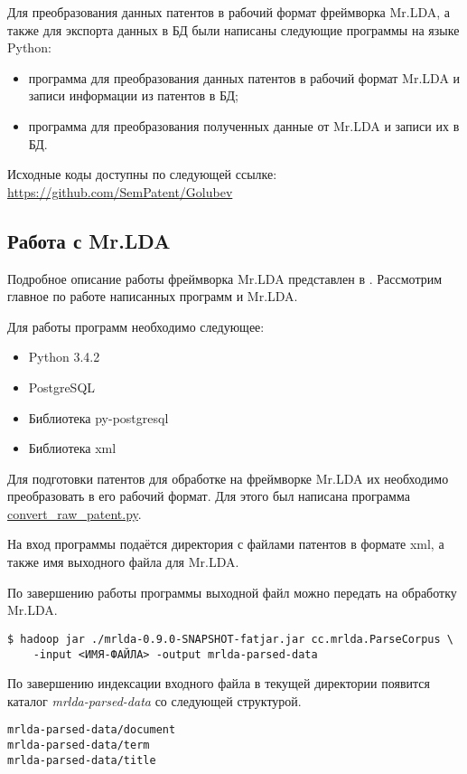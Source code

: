 Для преобразования данных патентов в рабочий формат фреймворка Mr.LDA, а также для экспорта данных в БД были написаны следующие программы на языке Python:
\begin{itemize}
    \item программа для преобразования данных патентов в рабочий формат Mr.LDA и записи информации из патентов в БД;
    \item программа для преобразования полученных данные от Mr.LDA и записи их в БД.
\end{itemize}
Исходные коды доступны по следующей ссылке: 
\url{https://github.com/SemPatent/Golubev}

\subsection{Работа с Mr.LDA}
Подробное описание работы фреймворка Mr.LDA представлен в \cite{mrlda}. Рассмотрим главное по работе написанных программ и Mr.LDA.

Для работы программ необходимо следующее:
\begin{itemize}
    \item Python 3.4.2
    \item PostgreSQL
    \item Библиотека py-postgresql
    \item Библиотека xml
\end{itemize}

Для подготовки патентов для обработке на фреймворке Mr.LDA их необходимо преобразовать в его рабочий формат. Для этого был написана 
программа \href{https://github.com/SemPatent/Golubev/blob/master/convert_raw_patent.py}{convert\_raw\_patent.py}.

На вход программы подаётся директория с файлами патентов в формате xml, а также имя выходного файла для Mr.LDA.

По завершению работы программы выходной файл можно передать на обработку Mr.LDA. 
\begin{lstlisting}
$ hadoop jar ./mrlda-0.9.0-SNAPSHOT-fatjar.jar cc.mrlda.ParseCorpus \
    -input <ИМЯ-ФАЙЛА> -output mrlda-parsed-data
\end{lstlisting}

По завершению индексации входного файла в текущей директории появится каталог \emph{mrlda-parsed-data} со следующей структурой.
\begin{lstlisting}
mrlda-parsed-data/document
mrlda-parsed-data/term
mrlda-parsed-data/title
\end{lstlisting}

